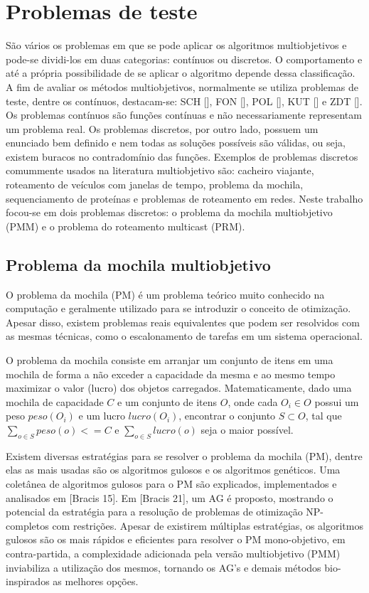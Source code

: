 \chapter[Problemas de teste]{Problemas de teste}

São vários os problemas em que se pode aplicar os algoritmos multiobjetivos e pode-se dividi-los em duas categorias: contínuos ou discretos. O comportamento e até a própria possibilidade de se aplicar o algoritmo depende dessa classificação. A fim de avaliar os métodos multiobjetivos, normalmente se utiliza problemas de teste, dentre os contínuos, destacam-se: SCH [], FON [], POL [], KUT [] e ZDT []. Os problemas contínuos são funções contínuas e não necessariamente representam um problema real. Os problemas discretos, por outro lado, possuem um enunciado bem definido e nem todas as soluções possíveis são válidas, ou seja, existem buracos no contradomínio das funções. Exemplos de problemas discretos comummente usados na literatura multiobjetivo são: cacheiro viajante, roteamento de veículos com janelas de tempo, problema da mochila, sequenciamento de proteínas e problemas de roteamento em redes. Neste trabalho focou-se em dois problemas discretos: o problema da mochila multiobjetivo (PMM) e o problema do roteamento multicast (PRM).

\section{Problema da mochila multiobjetivo}

O problema da mochila (PM) é um problema teórico muito conhecido na computação e geralmente utilizado para se introduzir o conceito de otimização. Apesar disso, existem problemas reais equivalentes que podem ser resolvidos com as mesmas técnicas, como o escalonamento de tarefas em um sistema operacional.

O problema da mochila consiste em arranjar um conjunto de itens em uma mochila de forma a não exceder a capacidade da mesma e ao mesmo tempo maximizar o valor (lucro) dos objetos carregados. Matematicamente, dado uma mochila de capacidade $C$ e um conjunto de itens $O$, onde cada $O_i \in O$ possui um peso $peso(O_i)$ e um lucro $lucro(O_i)$, encontrar o conjunto $S \subset O$, tal que $\sum_{o \in S} peso(o) <= C$ e $\sum_{o \in S} lucro(o)$ seja o maior possível.

Existem diversas estratégias para se resolver o problema da mochila (PM), dentre elas as mais usadas são os algoritmos gulosos e os algoritmos genéticos. Uma coletânea de algoritmos gulosos para o PM são explicados, implementados e analisados em [Bracis 15].  Em [Bracis 21], um AG é proposto, mostrando o potencial da estratégia para a resolução de problemas de otimização NP-completos com restrições. Apesar de existirem múltiplas estratégias, os algoritmos gulosos são os mais rápidos e eficientes para resolver o PM mono-objetivo, em contra-partida, a complexidade adicionada pela versão multiobjetivo (PMM) inviabiliza a utilização dos mesmos, tornando os AG's e demais métodos bio-inspirados as melhores opções.

